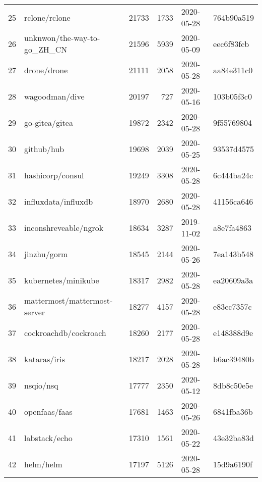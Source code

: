 \begin{longtable}{llrrll}
    25  &                                      rclone/rclone &  21733 &   1733 & 2020-05-28 &  764b90a519 \\
    26  &                        unknwon/the-way-to-go\_ZH\_CN &  21596 &   5939 & 2020-05-09 &  eec6f83fcb \\
    27  &                                        drone/drone &  21111 &   2058 & 2020-05-28 &  aa84e311c0 \\
    28  &                                     wagoodman/dive &  20197 &    727 & 2020-05-16 &  103b05f3c0 \\
    29  &                                     go-gitea/gitea &  19872 &   2342 & 2020-05-28 &  9f55769804 \\
    30  &                                         github/hub &  19698 &   2039 & 2020-05-25 &  93537d4575 \\
    31  &                                   hashicorp/consul &  19249 &   3308 & 2020-05-28 &  6c444ba24c \\
    32  &                                influxdata/influxdb &  18970 &   2680 & 2020-05-28 &  41156ca646 \\
    33  &                              inconshreveable/ngrok &  18634 &   3287 & 2019-11-02 &  a8e7fa4863 \\
    34  &                                        jinzhu/gorm &  18545 &   2144 & 2020-05-26 &  7ea143b548 \\
    35  &                                kubernetes/minikube &  18317 &   2982 & 2020-05-28 &  ea20609a3a \\
    36  &                       mattermost/mattermost-server &  18277 &   4157 & 2020-05-28 &  e83cc7357c \\
    37  &                              cockroachdb/cockroach &  18260 &   2177 & 2020-05-28 &  e148388d9e \\
    38  &                                       kataras/iris &  18217 &   2028 & 2020-05-28 &  b6ac39480b \\
    39  &                                          nsqio/nsq &  17777 &   2350 & 2020-05-12 &  8db8c50e5e \\
    40  &                                      openfaas/faas &  17681 &   1463 & 2020-05-26 &  6841fba36b \\
    41  &                                      labstack/echo &  17310 &   1561 & 2020-05-22 &  43e32ba83d \\
    42  &                                          helm/helm &  17197 &   5126 & 2020-05-28 &  15d9a6190f \\

\end{longtable}
